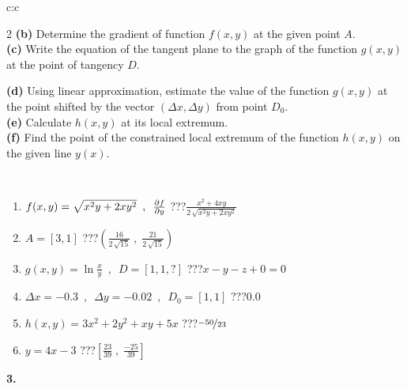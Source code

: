 \documentclass[10pt]{report}
\begin{document}
\begin{tabular}{c:c}
\begin{minipage}[c][104.5mm][t]{0.5\linewidth}
\begin{center}
\begin{minipage}{0.95\linewidth}
\begin{center}
{\begin{multicols}{2}
\textbf{(b)} Determine the gradient of function \(f(x,y)\) at the given point \(A\). \\[1mm]
\textbf{(c)} Write the equation of the tangent plane to the graph of the function \(g(x,y)\) at the point of tangency \(D\). \par \columnbreak
\textbf{(d)} Using linear approximation, estimate the value of the function \(g(x,y)\) at the point shifted by the vector \((\Delta x, \Delta y)\) from point \(D_0\). \\[1mm]
\textbf{(e)} Calculate \(h(x,y)\) at its local extremum. \\[1mm]
\textbf{(f)} Find the point of the constrained local extremum of the function \(h(x,y)\) on the given line \(y(x)\). \\[1mm]
\end{multicols}
}
\end{center}
\end{minipage}
\\[4mm]
\begin{minipage}{0.79\linewidth}
\begin{center}
\begin{varwidth}{\linewidth}
\begin{enumerate}
\normalsizerr
\item $f(x,y) = \sqrt{x^2y + 2xy^2}\enspace , \enspace \pdv{f}{y}$\quad \dotfill\; ???\;\dotfill \quad $\frac{x^2+4xy}{2\,\sqrt{x^2y+2xy^2}}$
\item $A = [3, 1]$\quad \dotfill\; ???\;\dotfill \quad $\left( \frac{16}{2\,\sqrt{15}} \;,\; \frac{21}{2\,\sqrt{15}} \right)$
\item $g(x,y) = \ln\frac{x}{y} \enspace , \enspace D=[1,1,?]$\quad \dotfill\; ???\;\dotfill \quad $x - y - z + 0 = 0$
\item $\Delta x = {-0.3} \enspace,\enspace \Delta y = {-0.02} \enspace,\enspace D_0 = [1,1]$\quad \dotfill\; ???\;\dotfill \quad $0.0$
\item $h(x,y) = 3x^2+2y^2+xy+5x$\quad \dotfill\; ???\;\dotfill \quad $\nicefrac{-50}{23}$
\item $y = 4x-3$\quad \dotfill\; ???\;\dotfill \quad $\left[\frac{23}{39}\;,\;\frac{-25}{39}\right]$
\end{enumerate}
\end{varwidth}
\end{center}
\end{minipage}
\begin{minipage}{0.20\linewidth}
\begin{center}
{\Huge\bfseries 3.} \\[2mm]

\end{center}
\end{minipage}
\end{center}
\end{minipage}
\end{tabular}
\end{document}
